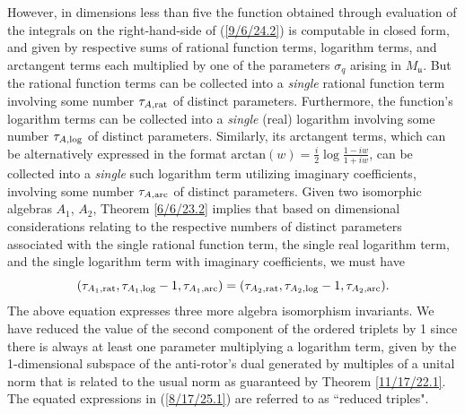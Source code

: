 \documentclass{amsart}
\theoremstyle{definition}
\numberwithin{theorem}{section}
\numberwithin{equation}{section}
\begin{document}
However, in dimensions less than five the function obtained through evaluation of the integrals on the right-hand-side of (\ref{9/6/24.2}) is computable in closed form, and given by respective sums of rational function terms, logarithm terms, and arctangent terms each multiplied by one of the parameters $\sigma_q$ arising in $M_{\mathfrak{u}}$.  But the rational function terms can be collected into a {\it single} rational function term involving some number $\tau_{A,{\rm rat}}$ of distinct parameters.  Furthermore, the function's logarithm terms can be collected into a {\it single} (real) logarithm involving some number $\tau_{A,{\rm log}}$ of distinct parameters.  Similarly, its arctangent terms, which can be alternatively expressed in the format $\text{arctan}(w) = \frac{i}{2}\log\frac{1-iw}{1+iw}$, can be collected into a {\it single} such logarithm term utilizing imaginary coefficients, involving some number $\tau_{A,{\rm arc}}$ of distinct parameters. 
Given two isomorphic algebras $A_1$, $A_2$, Theorem \ref{6/6/23.2}  implies that based on dimensional considerations relating to the respective numbers of distinct parameters associated with the single rational function term, the single real logarithm term, and the single logarithm term with imaginary coefficients, we must have \begin{equation}\label{8/17/25.1} (\tau_{A_1,{\rm rat}},\tau_{A_1,{\rm log}}-1,\tau_{A_1,{\rm arc}}) = (\tau_{A_2,{\rm rat}},\tau_{A_2,{\rm log}}-1,\tau_{A_2,{\rm arc}}).\end{equation}
The above equation expresses three more algebra isomorphism invariants.
We have reduced the value of the second component of the ordered triplets by 1 since there is always at least one parameter multiplying a logarithm term, given by the 1-dimensional subspace of the anti-rotor's dual generated by multiples of a unital norm that is related to the usual norm as guaranteed by Theorem \ref{11/17/22.1}.  The equated  expressions in (\ref{8/17/25.1}) are referred to as ``reduced triples".
      
\end{document}
